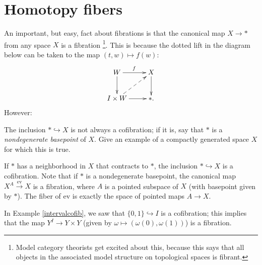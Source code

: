 \section{Homotopy fibers}
An important, but easy, fact about fibrations is that the canonical map $X\to \ast$ from any space $X$ is a fibration
\footnote{Model category theorists get excited about this, because this says that all objects in the associated model structure on
topological spaces is fibrant.}.
This is because the dotted lift in the diagram below can be taken to the map $(t,w)\mapsto f(w)$:
\begin{equation*}
    \xymatrix{
    W\ar[d]\ar[r]^f & X\ar[d]\\
    I\times W\ar@{-->}[ur]\ar[r] & \ast.
}
\end{equation*}
However:
\begin{exercise}
    The inclusion $\ast\hookrightarrow X$ is not always a cofibration;
    if it is, say that $\ast$ is a \emph{nondegenerate basepoint} of $X$.
    Give an example of a compactly generated space $X$ for which this is true.
\end{exercise}
If $\ast$ has a neighborhood in $X$ that contracts to $\ast$,
the inclusion $\ast\hookrightarrow X$ is a cofibration.
Note that if $\ast$ is a nondegenerate basepoint, the canonical map $X^A\xrightarrow{\mathrm{ev}} X$ is a fibration,
where $A$ is a pointed subspace of $X$ (with basepoint given by $\ast$).
The fiber of $\mathrm{ev}$ is exactly the space of pointed maps $A\to X$.

\begin{remark}
    In Example \ref{intervalcofib}, we saw that $\{0,1\}\hookrightarrow I$ is a cofibration;
    this implies that the map $Y^I\to Y\times Y$ (given by $\omega\mapsto (\omega(0),\omega(1))$) is a fibration.
\end{remark}
